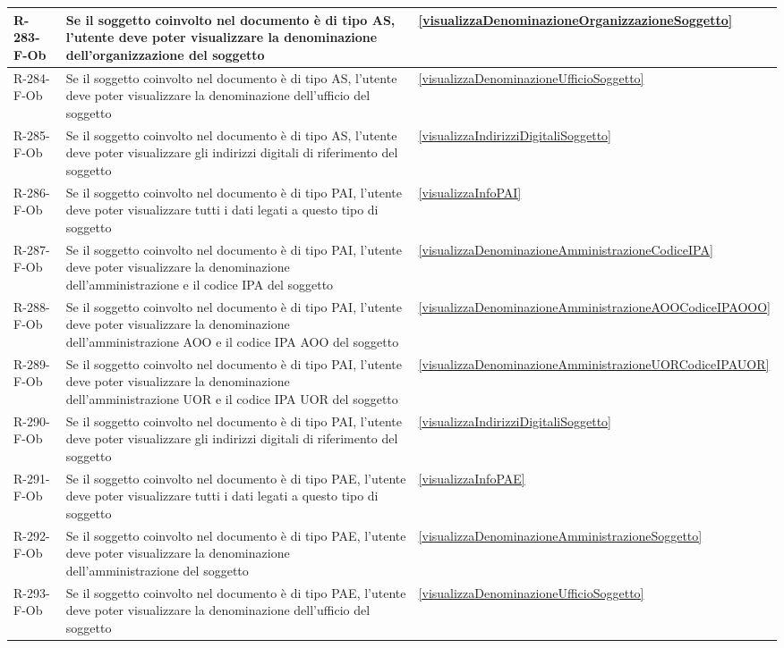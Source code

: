 \begin{longtable}{|p{2.5cm}|p{9.5cm}|p{2.5cm}|}
\hline
R-283-F-Ob & Se il soggetto coinvolto nel documento è di tipo AS, l'utente deve poter visualizzare la denominazione dell'organizzazione del soggetto & \ref{visualizzaDenominazioneOrganizzazioneSoggetto} \\
\hline
R-284-F-Ob & Se il soggetto coinvolto nel documento è di tipo AS, l'utente deve poter visualizzare la denominazione dell'ufficio del soggetto & \ref{visualizzaDenominazioneUfficioSoggetto} \\
\hline
R-285-F-Ob & Se il soggetto coinvolto nel documento è di tipo AS, l'utente deve poter visualizzare gli indirizzi digitali di riferimento del soggetto & \ref{visualizzaIndirizziDigitaliSoggetto} \\
\hline
R-286-F-Ob &Se il soggetto coinvolto nel documento è di tipo PAI, l'utente deve poter visualizzare tutti i dati legati a questo tipo di soggetto& \ref{visualizzaInfoPAI} \\
\hline
R-287-F-Ob & Se il soggetto coinvolto nel documento è di tipo PAI, l'utente deve poter visualizzare la denominazione dell'amministrazione e il codice IPA del soggetto & \ref{visualizzaDenominazioneAmministrazioneCodiceIPA} \\
\hline
R-288-F-Ob & Se il soggetto coinvolto nel documento è di tipo PAI, l'utente deve poter visualizzare la denominazione dell'amministrazione AOO e il codice IPA AOO del soggetto & \ref{visualizzaDenominazioneAmministrazioneAOOCodiceIPAOOO} \\
\hline
R-289-F-Ob & Se il soggetto coinvolto nel documento è di tipo PAI, l'utente deve poter visualizzare la denominazione dell'amministrazione UOR e il codice IPA UOR del soggetto & \ref{visualizzaDenominazioneAmministrazioneUORCodiceIPAUOR} \\
\hline
R-290-F-Ob & Se il soggetto coinvolto nel documento è di tipo PAI, l'utente deve poter visualizzare gli indirizzi digitali di riferimento del soggetto & \ref{visualizzaIndirizziDigitaliSoggetto} \\
\hline
R-291-F-Ob & Se il soggetto coinvolto nel documento è di tipo PAE, l'utente deve poter visualizzare tutti i dati legati a questo tipo di soggetto & \ref{visualizzaInfoPAE} \\
\hline
R-292-F-Ob & Se il soggetto coinvolto nel documento è di tipo PAE, l'utente deve poter visualizzare la denominazione dell'amministrazione del soggetto & \ref{visualizzaDenominazioneAmministrazioneSoggetto} \\
\hline
R-293-F-Ob & Se il soggetto coinvolto nel documento è di tipo PAE, l'utente deve poter visualizzare la denominazione dell'ufficio del soggetto & \ref{visualizzaDenominazioneUfficioSoggetto} \\

\end{longtable}
